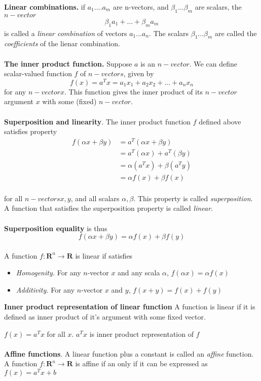 \documentclass[a4paper, 12pt]{article}
\begin{document}
\textbf{Linear combinations.}
if $a_1....a_m$ are n-vectors, and $\beta_1...\beta_m$ are scalars, the $n-vector$
\begin{align*}
\beta_1a_1+...+\beta_ma_m
\end{align*}
is called a \textit{linear combination} of vectors $a_1...a_n$. The scalars $\beta_1...\beta_m$
 are called the \textit{coefficients} of the lienar combination.
\\
\\
\textbf{The inner product function.} Suppose $a$ is an $n-vector$. We can define scalar-valued
function $f$ of $n-vectors$, given by
\begin{equation}
f(x) = a^Tx = a_1x_1 + a_2x_2+...+a_nx_n
\end{equation}
for any $n-vector x$. This function gives the inner product of its $n-vector$ argument $x$ with
some (fixed) $n-vector$.
\\
\\
\textbf{Superposition and linearity}. The inner product function $f$ defined above satisfies
property
\begin{align*}
f(\alpha x +\beta y) &= a^T(\alpha x + \beta y) \\
&= a^T(\alpha x) + a^T(\beta y) \\
&= \alpha(a^Tx) + \beta(a^Ty) \\
&= \alpha f(x) + \beta f(x)
\end{align*}
\\
for all $n-vectors x, y$, and all scalars $\alpha, \beta$. This property is called \textit{superposition}.
 A function that satisfies the superposition property is called \textit{linear}.
\\
\\
\textbf{Superposition equality} is thus
\begin{equation}
f(\alpha x + \beta y) = \alpha f(x) + \beta f(y)
\end{equation}
\\
A function  $ f: \mathbf{R}^n \to \mathbf{R} $ is linear if satisfies
\begin{itemize}
\item \textit{Homogenity.} For any $n$-vector $x$ and any scala $\alpha$, $f(\alpha x) = \alpha f(x)$
\item \textit{Additivity.} For any $n$-vector $x$ and $y$, $f(x + y) = f(x) + f(y)$
\end{itemize}

\textbf{Inner product representation of linear function}
A function is linear if it is defined as inner product of it's argument with some fixed vector.

$f(x) = a^Tx$ for all $x$.
$a^Tx$ is inner product representation of $f$
\\
\\
\textbf{Affine functions}. A linear function plus a constant is called an \textit{affine} function.
A function $f: \mathbf{R} ^n \to \mathbf{R}$ is affine if an only if it can be expressed as $f(x) = a^T x + b$
\end{document}
